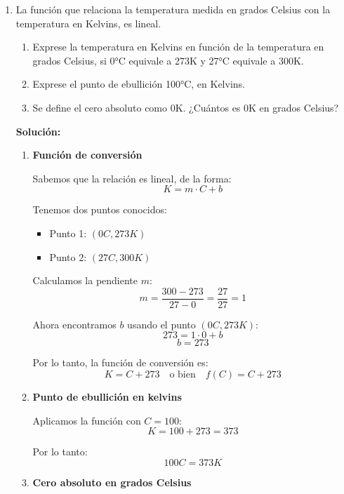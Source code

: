 \documentclass[12pt]{article}
\begin{document}
\begin{enumerate}[label=\alph*.-]
\begin{enumerate}[label=\roman*.]
        Por lo tanto: \[\boxed{P(x) = 5.68x - 98000}\]
    \end{enumerate}
    
    \item La función que relaciona la temperatura medida en grados Celsius con la temperatura en Kelvins, es lineal.
    \begin{enumerate}[label=\roman*.]
        \item Exprese la temperatura en Kelvins en función de la temperatura en grados Celsius, si 0°C equivale a 273K y 27°C equivale a 300K.
        \item Exprese el punto de ebullición 100°C, en Kelvins.
        \item Se define el cero absoluto como 0K. ¿Cuántos es 0K en grados Celsius?
    \end{enumerate}
    
    \textbf{Solución:}
    
    \begin{enumerate}[label=\roman*.]
        \item \textbf{Función de conversión}
        
        Sabemos que la relación es lineal, de la forma:
        \[K = m \cdot C + b\]
        
        Tenemos dos puntos conocidos:
        \begin{itemize}
            \item Punto 1: $(0C, 273K)$
            \item Punto 2: $(27C, 300K)$
        \end{itemize}
        
        Calculamos la pendiente $m$:
        \[m = \frac{300 - 273}{27 - 0} = \frac{27}{27} = 1\]
        
        Ahora encontramos $b$ usando el punto $(0C, 273K)$:
        \[273 = 1 \cdot 0 + b\]
        \[b = 273\]
        
        Por lo tanto, la función de conversión es:
        \[\boxed{K = C + 273} \quad \text{o bien} \quad \boxed{f(C) = C + 273}\]
        
        \item \textbf{Punto de ebullición en kelvins}
        
        Aplicamos la función con $C = 100$:
        \[K = 100 + 273 = 373\]
        
        Por lo tanto: \[\boxed{100C = 373K}\]
        
        \item \textbf{Cero absoluto en grados Celsius}
        

\end{enumerate}
\end{enumerate}
\end{document}
